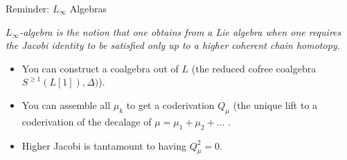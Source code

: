 \documentclass[10pt]{beamer}
\begin{document}
\begin{frame}{Reminder: $L_\infty$ Algebras}

		\emph{
			$L_\infty$-algebra is the notion that one obtains from a Lie algebra when one requires the Jacobi identity to be satisfied only up to a higher coherent chain homotopy.
		}
		\\
		\vspace{.5em}
		\begin{defblock}
			
		\end{defblock}	
	\pause

	\begin{itemize}
		\item<2-> You can construct a coalgebra out of $L$ 
			{\small \color{UniGreen} (the reduced cofree coalgebra $S^{\geq 1}(L[1]),\Delta)$)}.
		\item<3-> You can assemble all $\mu_k$ to get a coderivation $Q_\mu$
				{\small \color{UniGreen} (the unique lift to a coderivation of the decalage of $ \mu=	\mu_1+\mu_2 + \dots$ }.
		\item<4-> Higher Jacobi is tantamount to having $Q_\mu ^2 = 0$.

	\end{itemize}
\end{frame}
\end{document}
